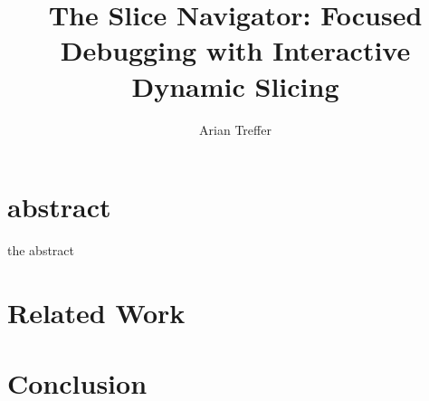 \documentclass[
			english,
			]{scrbook}
\begin{document}
\title{The Slice Navigator: Focused Debugging with Interactive Dynamic Slicing}

\author{Arian Treffer}

\maketitle


\linenumbers

\chapter*{abstract}
the abstract










\chapter{Related Work}

\chapter{Conclusion}


\nocite{*}
\printbibliography
\end{document}

